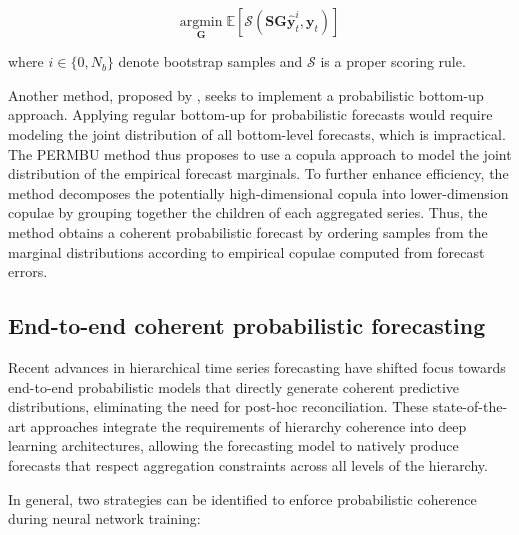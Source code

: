 \documentclass[letterpaper]{article}
\begin{document}
\begin{equation}
    \underset{\mathbf{G}}{\mathrm{argmin}} \; \mathbb{E}\left[ \mathcal{S}(\mathbf{SG}\hat{\mathbf{y}}^i_t, \mathbf{y}_t) \right]
\end{equation}

where $i\in\{0, N_b\}$ denote bootstrap samples and $\mathcal{S}$ is a proper scoring rule. 

Another method, proposed by \cite{PERMBU}, seeks to implement a probabilistic bottom-up approach. Applying regular bottom-up for probabilistic forecasts would require modeling the joint distribution of all bottom-level forecasts, which is impractical. The PERMBU method thus proposes to use a copula approach to model the joint distribution of the empirical forecast marginals. To further enhance efficiency, the method decomposes the potentially high-dimensional copula into lower-dimension copulae by grouping together the children of each aggregated series. Thus, the method obtains a coherent probabilistic forecast by ordering samples from the marginal distributions according to empirical copulae computed from forecast errors. 

\subsection{End-to-end coherent probabilistic forecasting}

Recent advances in hierarchical time series forecasting have shifted focus towards end-to-end probabilistic models that directly generate coherent predictive distributions, eliminating the need for post-hoc reconciliation. These state-of-the-art approaches integrate the requirements of hierarchy coherence into deep learning architectures, allowing the forecasting model to natively produce forecasts that respect aggregation constraints across all levels of the hierarchy.

In general, two strategies can be identified to enforce probabilistic coherence during neural network training: 
\end{document}
